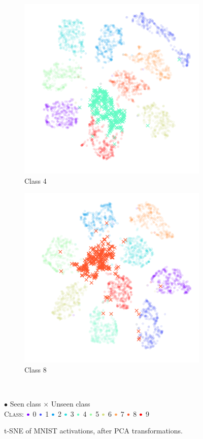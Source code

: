 \documentclass[10pt]{article}
\newcommand{\legendBulletMNIST}{
    \begin{minipage}[t]{0.5\textwidth}
    \centering
    $\bullet$ Seen class $\times$ Unseen class\\
    \textsc{Class}:
    ${\color[rgb]{0.5, 0., 1.}\bullet}$ 0
    ${\color[rgb]{0.28, 0.34, 0.99}\bullet}$ 1
    ${\color[rgb]{0.06, 0.64, 0.94}\bullet}$ 2
    ${\color[rgb]{0.17, 0.87, 0.87}\bullet}$ 3
    ${\color[rgb]{0.39, 0.98, 0.77}\bullet}$ 4
    ${\color[rgb]{0.61, 0.98, 0.64}\bullet}$ 5
    ${\color[rgb]{0.83, 0.87, 0.5 }\bullet}$ 6
    ${\color[rgb]{1.  , 0.64, 0.34}\bullet}$ 7
    ${\color[rgb]{1.  , 0.34, 0.17}\bullet}$ 8
    ${\color[rgb]{1.  , 0.  , 0.  }\bullet}$ 9
    \end{minipage}
    }
\begin{document}
\begin{figure}[H]
    \centering
    \begin{subfigure}{.49\textwidth}
        \centering
        \includegraphics[width=\textwidth]{MNIST_t-SNE_wo_cl_4_after}
        \caption{Class 4}
    \end{subfigure}
    \begin{subfigure}{.5\textwidth}
        \centering
        \includegraphics[width=\textwidth]{MNIST_t-SNE_wo_cl_8_after}
        \caption{Class 8}
    \end{subfigure}
    \\[.2cm]
    \legendBulletMNIST
    \caption{t-SNE of MNIST activations, after \gls{PCA} transformations.}
    \label{fig:tsne-mnist-miscl}
\end{figure}
\end{document}
